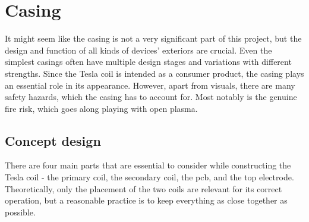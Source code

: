 \chapter{Casing}

It might seem like the casing is not a very significant part of this project, but the design and function of all kinds of devices' exteriors are crucial. Even the simplest casings often have multiple design stages and variations with different strengths. Since the Tesla coil is intended as a consumer product, the casing plays an essential role in its appearance. However, apart from visuals, there are many safety hazards, which the casing has to account for. Most notably is the genuine fire risk, which goes along playing with open plasma.


\section{Concept design}
\label{sec:concept-design}

There are four main parts that are essential to consider while constructing the Tesla coil - the primary coil, the secondary coil, the \gls{pcb}, and the top electrode. Theoretically, only the placement of the two coils are relevant for its correct operation, but a reasonable practice is to keep everything as close together as possible.

